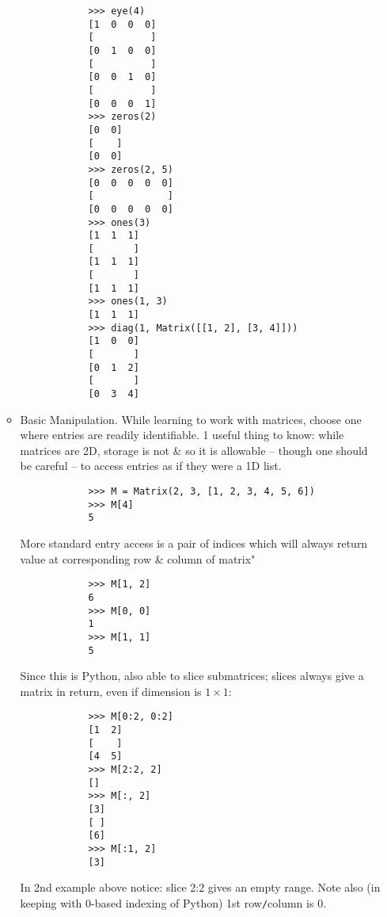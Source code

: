 \documentclass{article}
\begin{document}
\begin{itemize}
\begin{itemize}
		\begin{verbatim}
			>>> eye(4)
			[1  0  0  0]
			[          ]
			[0  1  0  0]
			[          ]
			[0  0  1  0]
			[          ]
			[0  0  0  1]
			>>> zeros(2)
			[0  0]
			[    ]
			[0  0]
			>>> zeros(2, 5)
			[0  0  0  0  0]
			[             ]
			[0  0  0  0  0]
			>>> ones(3)
			[1  1  1]
			[       ]
			[1  1  1]
			[       ]
			[1  1  1]
			>>> ones(1, 3)
			[1  1  1]
			>>> diag(1, Matrix([[1, 2], [3, 4]]))
			[1  0  0]
			[       ]
			[0  1  2]
			[       ]
			[0  3  4]
		\end{verbatim}
		\item {\sc Basic Manipulation.} While learning to work with matrices, choose one where entries are readily identifiable. 1 useful thing to know: while matrices are 2D, storage is not \& so it is allowable -- though one should be careful -- to access entries as if they were a 1D list.
		\begin{verbatim}
			>>> M = Matrix(2, 3, [1, 2, 3, 4, 5, 6])
			>>> M[4]
			5
		\end{verbatim}
		More standard entry access is a pair of indices which will always return value at corresponding row \& column of matrix"
		\begin{verbatim}
			>>> M[1, 2]
			6
			>>> M[0, 0]
			1
			>>> M[1, 1]
			5
		\end{verbatim}
		Since this is Python, also able to slice submatrices; slices always give a matrix in return, even if dimension is $1\times1$:
		\begin{verbatim}
			>>> M[0:2, 0:2]
			[1  2]
			[    ]
			[4  5]
			>>> M[2:2, 2]
			[]
			>>> M[:, 2]
			[3]
			[ ]
			[6]
			>>> M[:1, 2]
			[3]
		\end{verbatim}
		In 2nd example above notice: slice 2:2 gives an empty range. Note also (in keeping with 0-based indexing of Python) 1st row{\tt/}column is 0.
		

\end{itemize}
\end{itemize}
\end{document}
